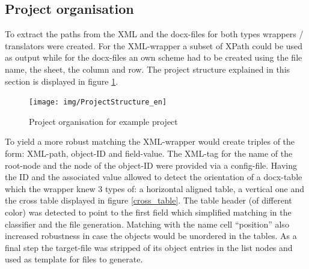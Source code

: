 \documentclass[conference]{IEEEtran}
\begin{document}
\subsection{Project organisation}
To extract the paths from the XML and the docx-files for both types wrappers / translators
were created. For the XML-wrapper a subset of XPath could be used as output while for the
docx-files an own scheme had to be created using the file name, the sheet, the column and
row. The project structure explained in this section is displayed in figure
\ref{project_structure}.
\begin{figure}[h]
 \centering
 \texttt{[image: img/ProjectStructure\_en]}
 \caption{Project organisation for example project}
 \label{project_structure}
\end{figure}
To yield a more robust matching the XML-wrapper would create triples of
the form: XML-path, object-ID and field-value. The XML-tag for the name of the root-node and
the node of the object-ID were provided via a config-file. Having the ID and the associated
value allowed to detect the orientation of a docx-table which the wrapper knew 3 types of:
a horizontal aligned table, a vertical one and the cross table displayed in figure
\ref{cross_table}. The table header (of different color) was detected to point to the first
field which simplified matching in the classifier and the file generation. Matching with the
name cell ``position'' also increased robustness in case the objects would be unordered in
the tables. As a final step the target-file was stripped of its object entries in the list
nodes and used as template for files to generate.
\end{document}
